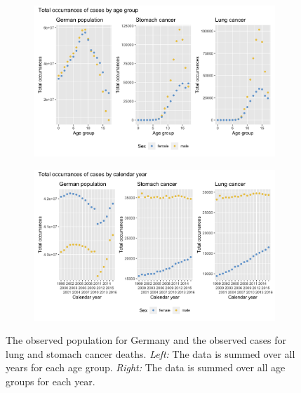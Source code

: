 \begin{figure}
    \centering
    \begin{subfigure}[b]{.6\linewidth}
        \includegraphics[width=\linewidth]{real-data/real-data-univariate/Figures/data-age-total.png}
    \end{subfigure}
    
    \begin{subfigure}[b]{.6\linewidth}
        \includegraphics[width=\linewidth]{real-data/real-data-univariate/Figures/data-year-total.png}
    \end{subfigure}
    \caption{The observed population for Germany and the observed cases for lung and stomach cancer deaths. \textit{Left:} The data is summed over all years for each age group. \textit{Right:} The data is summed over all age groups for each year.}
    \label{fig:data-total}
\end{figure}

